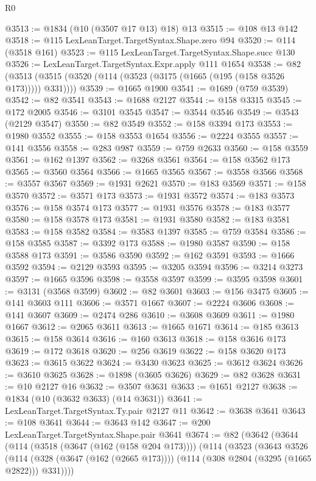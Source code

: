 \begin{lexlean}{R0}
\begin{coremodule}
@3513 := @1834 (@10 (@3507 @17 @13) @18) @13
@3515 := @108 @13 @142
@3518 := @115 LexLeanTarget.TargetSyntax.Shape.zero @94
@3520 := @114 (@3518 @161)
@3523 := @115 LexLeanTarget.TargetSyntax.Shape.succ @130
@3526 := LexLeanTarget.TargetSyntax.Expr.apply @111 @1654
@3538 := @82 (@3513 (@3515 (@3520 (@114 (@3523 (@3175 (@1665 (@195 (@158 @3526 @173))))) @331))))
@3539 := @1665 @1900
@3541 := @1689 (@759 @3539)
@3542 := @82 @3541
@3543 := @1688 @2127
@3544 := @158 @3315
@3545 := @172 @2005
@3546 := @3101 @3545
@3547 := @3544 @3546
@3549 := @3543 (@2129 @3547)
@3550 := @82 @3549
@3552 := @158 @3394 @173
@3553 := @1980 @3552
@3555 := @158 @3553 @1654
@3556 := @2224 @3555
@3557 := @141 @3556
@3558 := @283 @987
@3559 := @759 @2633
@3560 := @158 @3559
@3561 := @162 @1397
@3562 := @3268 @3561
@3564 := @158 @3562 @173
@3565 := @3560 @3564
@3566 := @1665 @3565
@3567 := @3558 @3566
@3568 := @3557 @3567
@3569 := @1931 @2621
@3570 := @183 @3569
@3571 := @158 @3570
@3572 := @3571 @173
@3573 := @1931 @3572
@3574 := @183 @3573
@3576 := @158 @3574 @173
@3577 := @1931 @3576
@3578 := @183 @3577
@3580 := @158 @3578 @173
@3581 := @1931 @3580
@3582 := @183 @3581
@3583 := @158 @3582
@3584 := @3583 @1397
@3585 := @759 @3584
@3586 := @158 @3585
@3587 := @3392 @173
@3588 := @1980 @3587
@3590 := @158 @3588 @173
@3591 := @3586 @3590
@3592 := @162 @3591
@3593 := @1666 @3592
@3594 := @2129 @3593
@3595 := @3205 @3594
@3596 := @3214 @3273
@3597 := @1665 @3596
@3598 := @3558 @3597
@3599 := @3595 @3598
@3601 := @3131 (@3568 @3599)
@3602 := @82 @3601
@3603 := @156 @3475
@3605 := @141 @3603 @111
@3606 := @3571 @1667
@3607 := @2224 @3606
@3608 := @141 @3607
@3609 := @2474 @286
@3610 := @3608 @3609
@3611 := @1980 @1667
@3612 := @2065 @3611
@3613 := @1665 @1671
@3614 := @185 @3613
@3615 := @158 @3614
@3616 := @160 @3613
@3618 := @158 @3616 @173
@3619 := @172 @3618
@3620 := @256 @3619
@3622 := @158 @3620 @173
@3623 := @3615 @3622
@3624 := @3430 @3623
@3625 := @3612 @3624
@3626 := @3610 @3625
@3628 := @1898 (@3605 @3626)
@3629 := @82 @3628
@3631 := @10 @2127 @16
@3632 := @3507 @3631
@3633 := @1651 @2127
@3638 := @1834 (@10 (@3632 @3633) (@14 @3631))
@3641 := LexLeanTarget.TargetSyntax.Ty.pair @2127 @11
@3642 := @3638 @3641
@3643 := @108 @3641
@3644 := @3643 @142
@3647 := @200 LexLeanTarget.TargetSyntax.Shape.pair @3641
@3674 := @82
    (@3642
      (@3644
        (@114
          (@3518 (@3647 (@162 (@158 @204 @173))))
          (@114
            (@3523
              (@3643
                @3526
                (@114
                  (@328 (@3647 (@162 (@2665 @173))))
                  (@114 (@308 @2804 (@3295 (@1665 @2822))) @331))))

\end{coremodule}
\end{lexlean}

